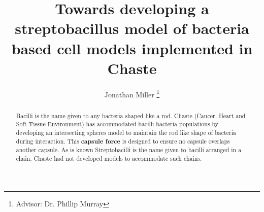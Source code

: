\documentclass[journal, a4paper]{IEEEtran}
\begin{document}
	\title{Towards developing a streptobacillus model of bacteria based cell models implemented in Chaste}
	\author{Jonathan Miller
	\thanks{Advisor: Dr. Phillip Murray}}
	\maketitle

\begin{abstract}
	 Bacilli is the name given to any bacteria shaped like a rod. Chaste (Cancer, Heart and Soft Tissue Environment) has accommodated bacilli bacteria populations by developing an intersecting spheres model to maintain the rod like shape of bacteria during interaction. This \textbf{capsule force} is designed to ensure no capsule overlaps another capsule. As is known Streptobacilli is the name given to bacilli arranged in a chain. Chaste had not developed models to accommodate such chains.
\end{abstract}

\end{document}
